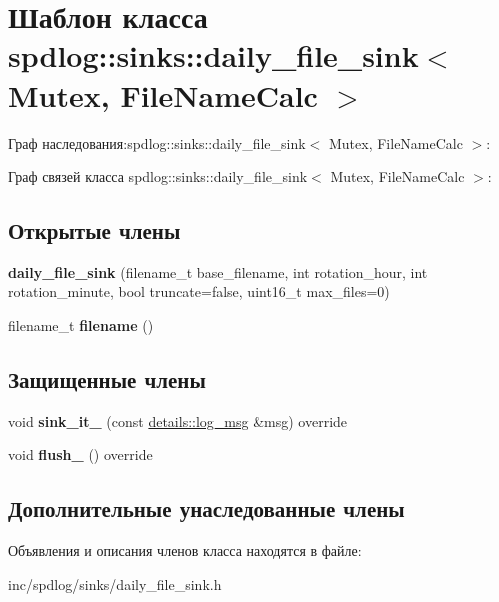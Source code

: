 \hypertarget{classspdlog_1_1sinks_1_1daily__file__sink}{}\section{Шаблон класса spdlog\+:\+:sinks\+:\+:daily\+\_\+file\+\_\+sink$<$ Mutex, File\+Name\+Calc $>$}
\label{classspdlog_1_1sinks_1_1daily__file__sink}


Граф наследования\+:spdlog\+:\+:sinks\+:\+:daily\+\_\+file\+\_\+sink$<$ Mutex, File\+Name\+Calc $>$\+:


Граф связей класса spdlog\+:\+:sinks\+:\+:daily\+\_\+file\+\_\+sink$<$ Mutex, File\+Name\+Calc $>$\+:
\subsection*{Открытые члены}
\begin{DoxyCompactItemize}
\item 
\mbox{\label{classspdlog_1_1sinks_1_1daily__file__sink_aa47443ab4ea2909f21fb5d72e22d0c7b}} 
{\bfseries daily\+\_\+file\+\_\+sink} (filename\+\_\+t base\+\_\+filename, int rotation\+\_\+hour, int rotation\+\_\+minute, bool truncate=false, uint16\+\_\+t max\+\_\+files=0)
\item 
\mbox{\label{classspdlog_1_1sinks_1_1daily__file__sink_aed2c27d6d18c70bc837f36257d3a14e9}} 
filename\+\_\+t {\bfseries filename} ()
\end{DoxyCompactItemize}
\subsection*{Защищенные члены}
\begin{DoxyCompactItemize}
\item 
\mbox{\label{classspdlog_1_1sinks_1_1daily__file__sink_ac82447cddb7a2ddb45ab81f97b74286d}} 
void {\bfseries sink\+\_\+it\+\_\+} (const \hyperlink{structspdlog_1_1details_1_1log__msg}{details\+::log\+\_\+msg} \&msg) override
\item 
\mbox{\label{classspdlog_1_1sinks_1_1daily__file__sink_a37199f25868ac70b91e4f126bcc4b3f8}} 
void {\bfseries flush\+\_\+} () override
\end{DoxyCompactItemize}
\subsection*{Дополнительные унаследованные члены}


Объявления и описания членов класса находятся в файле\+:\begin{DoxyCompactItemize}
\item 
inc/spdlog/sinks/daily\+\_\+file\+\_\+sink.\+h\end{DoxyCompactItemize}

